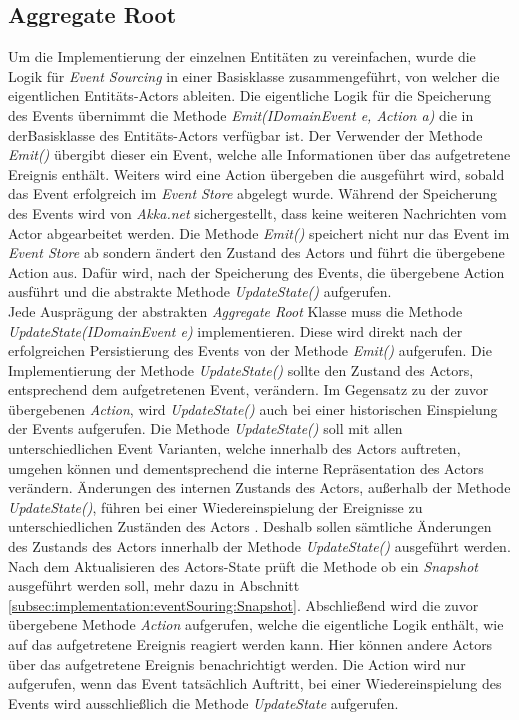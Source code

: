 \subsection{Aggregate Root}
Um die Implementierung der einzelnen Entitäten zu vereinfachen, wurde die Logik für \textit{Event Sourcing} in einer Basisklasse zusammengeführt, von welcher die eigentlichen Entitäts-Actors ableiten. 
Die eigentliche Logik für die Speicherung des Events übernimmt die Methode \textit{Emit(IDomainEvent e, Action a)} die in derBasisklasse des Entitäts-Actors verfügbar ist. Der Verwender der Methode \textit{Emit()} übergibt dieser ein Event, welche alle Informationen über das aufgetretene Ereignis enthält. Weiters wird eine Action übergeben die ausgeführt wird, sobald das Event erfolgreich im \textit{Event Store} abgelegt wurde. Während der Speicherung des Events wird von \textit{Akka.net} sichergestellt, dass keine weiteren Nachrichten vom Actor abgearbeitet werden. Die Methode \textit{Emit()} speichert nicht nur das Event im \textit{Event Store} ab sondern ändert den Zustand des Actors und führt die übergebene Action aus. Dafür wird, nach der Speicherung des Events, die übergebene Action ausführt und die abstrakte Methode \textit{UpdateState()} aufgerufen. \\
Jede Ausprägung der abstrakten \textit{Aggregate Root} Klasse muss die Methode \textit{UpdateState(IDomainEvent e)} implementieren. Diese wird direkt nach der erfolgreichen Persistierung des Events von der Methode \textit{Emit()} aufgerufen. Die Implementierung der Methode \textit{UpdateState()} sollte den Zustand des Actors, entsprechend dem aufgetretenen Event, verändern. Im Gegensatz zu der zuvor übergebenen \textit{Action}, wird \textit{UpdateState()} auch bei einer historischen Einspielung der Events aufgerufen. Die Methode \textit{UpdateState()} soll mit allen unterschiedlichen Event Varianten, welche innerhalb des Actors auftreten, umgehen können und dementsprechend die interne Repräsentation des Actors verändern. Änderungen des internen Zustands des Actors, außerhalb der Methode \textit{UpdateState()}, führen bei einer Wiedereinspielung der Ereignisse zu unterschiedlichen Zuständen des Actors . Deshalb sollen sämtliche Änderungen des Zustands des Actors innerhalb der Methode \textit{UpdateState()} ausgeführt werden. \\
Nach dem Aktualisieren des Actors-State prüft die Methode ob ein \textit{Snapshot} ausgeführt werden soll, mehr dazu in Abschnitt \ref{subsec:implementation:eventSouring:Snapshot}. Abschließend wird die zuvor übergebene Methode \textit{Action} aufgerufen, welche die eigentliche Logik enthält, wie auf das aufgetretene Ereignis reagiert werden kann. Hier können andere Actors über das aufgetretene Ereignis benachrichtigt werden. Die Action wird nur aufgerufen, wenn das Event tatsächlich Auftritt, bei einer Wiedereinspielung des Events wird ausschließlich die Methode \textit{UpdateState} aufgerufen. \\ 

